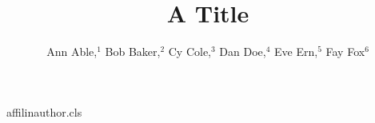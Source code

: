 \begin{filecontents*}[overwrite]{affilinauthor.cls}
\def\affilfont{\small}
\def\affil#1{\par{\reset@font\affilfont#1\par}}
\def\address#1{\par{\reset@font\affilfont#1\par}}
\def\@maketitle{\newpage{\Large\bfseries\@title\par}\vskip1em\noindent{\bfseries\@author\par}\vskip1em}
\end{filecontents*}
\documentclass{affilinauthor}

\title{A Title}
\author{Ann Able,$^1$ Bob Baker,$^2$ Cy Cole,$^3$ Dan Doe,$^4$ Eve Ern,$^5$ Fay Fox$^6$
}
\maketitle
Body.

